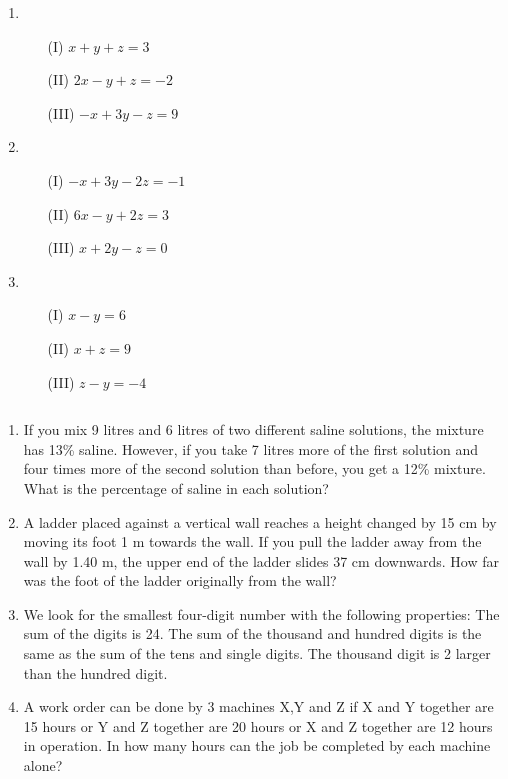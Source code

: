 \newpage
\begin{exer}
$ $

\begin{enumerate}[label=\emph{\alph*})]

\item
\begin{itemize}
\item[(I)] $x+y+z=3$
\item[(II)] $2x-y+z=-2$
\item[(III)] $-x+3y-z=9$
\end{itemize}
\vfill

\item
\begin{itemize}
\item[(I)] $-x+3y-2z=-1$
\item[(II)] $6x-y+2z=3$
\item[(III)] $x+2y-z=0$
\end{itemize}
\vfill

\item
\begin{itemize}
\item[(I)] $x-y=6$
\item[(II)] $x+z=9$
\item[(III)] $z-y=-4$
\end{itemize}
\vfill

\end{enumerate}
\end{exer}

\newpage
\begin{exer} 
$ $

\begin{enumerate}[label=\emph{\alph*})]
\item
If you mix 9 litres and 6 litres of two different saline solutions, the mixture has 13\% saline. However, if you take 7 litres more of the first solution and four times more of the second solution than before, you get a 12\% mixture. What is the percentage of saline in each solution?
\vfill

\item A ladder placed against a vertical wall reaches a height changed by 15 cm by moving its foot 1 m towards the wall. If you pull the ladder away from the wall by 1.40 m, the upper end of the ladder slides 37 cm downwards. How far was the foot of the ladder originally from the wall?
\vfill

\item
We look for the smallest four-digit number with the following properties: The sum of the digits is 24. The sum of the thousand and hundred digits is the same as the sum of the tens and single digits. The thousand digit is 2 larger than the hundred digit.
\vfill

\item A work order can be done by 3 machines X,Y and Z if X and Y together are 15 hours or Y and Z together are 20 hours or X and Z together are 12 hours in operation. In how many hours can the job be completed by each machine alone?
\vfill
\end{enumerate}

\end{exer}


